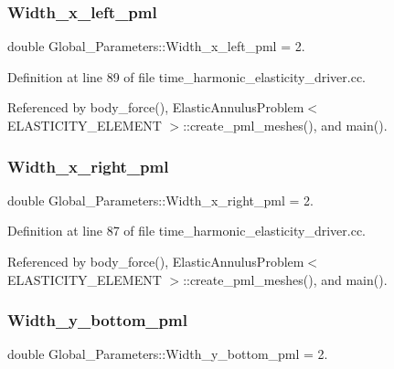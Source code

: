 \subsubsection{\texorpdfstring{Width\+\_\+x\+\_\+left\+\_\+pml}{Width\_x\_left\_pml}}
{\footnotesize\ttfamily double Global\+\_\+\+Parameters\+::\+Width\+\_\+x\+\_\+left\+\_\+pml = 2.}



Definition at line 89 of file time\+\_\+harmonic\+\_\+elasticity\+\_\+driver.\+cc.



Referenced by body\+\_\+force(), Elastic\+Annulus\+Problem$<$ E\+L\+A\+S\+T\+I\+C\+I\+T\+Y\+\_\+\+E\+L\+E\+M\+E\+N\+T $>$\+::create\+\_\+pml\+\_\+meshes(), and main().

\mbox{\label{namespaceGlobal__Parameters_a140b1b8aaef0bf2b94acf75d681d4545}} 
\subsubsection{\texorpdfstring{Width\+\_\+x\+\_\+right\+\_\+pml}{Width\_x\_right\_pml}}
{\footnotesize\ttfamily double Global\+\_\+\+Parameters\+::\+Width\+\_\+x\+\_\+right\+\_\+pml = 2.}



Definition at line 87 of file time\+\_\+harmonic\+\_\+elasticity\+\_\+driver.\+cc.



Referenced by body\+\_\+force(), Elastic\+Annulus\+Problem$<$ E\+L\+A\+S\+T\+I\+C\+I\+T\+Y\+\_\+\+E\+L\+E\+M\+E\+N\+T $>$\+::create\+\_\+pml\+\_\+meshes(), and main().

\mbox{\label{namespaceGlobal__Parameters_a67848e80f63ec793108a4710a28cc3a9}} 
\subsubsection{\texorpdfstring{Width\+\_\+y\+\_\+bottom\+\_\+pml}{Width\_y\_bottom\_pml}}
{\footnotesize\ttfamily double Global\+\_\+\+Parameters\+::\+Width\+\_\+y\+\_\+bottom\+\_\+pml = 2.}



